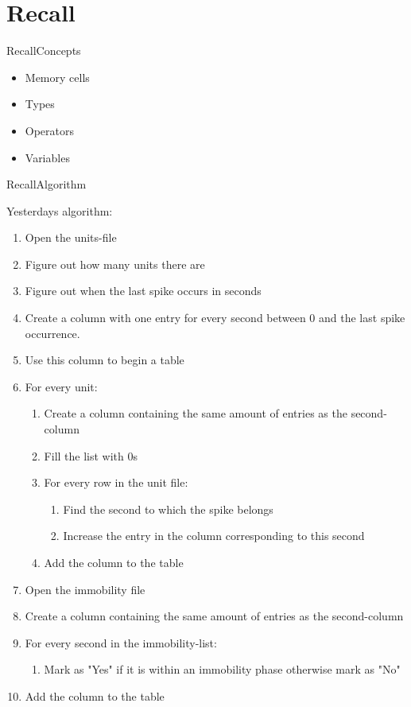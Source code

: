 \documentclass[aspectratio=169]{beamer}
\begin{document}
\section{Recall}
\begin{frame}{Recall}{Concepts}
\begin{itemize}
	\item Memory cells
	\item Types
	\item Operators
	\item Variables
\end{itemize}
\end{frame}

\begin{frame}{Recall}{Algorithm}

Yesterdays algorithm:

\begin{enumerate}
\item {Open the units-file}
\item {Figure out how many units there are}
\item {Figure out when the last spike occurs in seconds}
\item {Create a column with one entry for every second between 0 and the last spike occurrence.}
\item {Use this column to begin a table}
\item {For every unit:}
\begin{enumerate}
	\item {Create a column containing the same amount of entries as the second-column}
	\item {Fill the list with 0s}
	\item {For every row in the unit file:}
	\begin{enumerate}
		\item {Find the second to which the spike belongs}
		\item {Increase the entry in the column corresponding to this second}
	\end{enumerate}
	\item {Add the column to the table}
\end{enumerate}
\item {Open the immobility file}
\item {Create a column containing the same amount of entries as the second-column}
\item {For every second in the immobility-list:}
\begin{enumerate}
	\item {Mark as "Yes" if it is within an immobility phase otherwise mark as "No"}
\end{enumerate}
\item {Add the column to the table}
\end{enumerate}
\end{frame}
\end{document}
